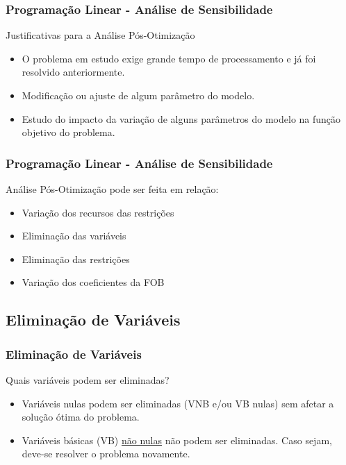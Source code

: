 \documentclass{beamer}
\begin{document}
\begin{frame}
	\frametitle{Programação Linear - Análise de Sensibilidade}
	\begin{block}{Justificativas para a Análise Pós-Otimização}
		\begin{itemize}
			\item O problema em estudo exige grande tempo de processamento e já foi resolvido anteriormente.
			\item Modificação ou ajuste de algum parâmetro do modelo.
			\item Estudo do impacto da variação de alguns parâmetros do modelo na função objetivo do problema.
		\end{itemize}
	\end{block}
\end{frame}

\begin{frame}
	\frametitle{Programação Linear - Análise de Sensibilidade}
	\begin{exampleblock}{Análise Pós-Otimização pode ser feita em relação:}
		\begin{itemize}
			\item Variação dos recursos das restrições
			\item Eliminação das variáveis
			\item Eliminação das restrições
			\item Variação dos coeficientes da FOB
		\end{itemize}
	\end{exampleblock}
\end{frame}


\subsection{Eliminação de Variáveis}
\begin{frame}
	\frametitle{Eliminação de Variáveis}
	\begin{block}{Quais variáveis podem ser eliminadas?}
		\begin{itemize}
			\item Variáveis nulas podem ser eliminadas (VNB e/ou VB nulas) sem afetar a solução ótima do problema.
			\item Variáveis básicas (VB) \underline{não nulas} {\color{red}não podem} ser eliminadas. Caso sejam, deve-se resolver o problema novamente.
		\end{itemize}
	\end{block}
\end{frame}
\end{document}
